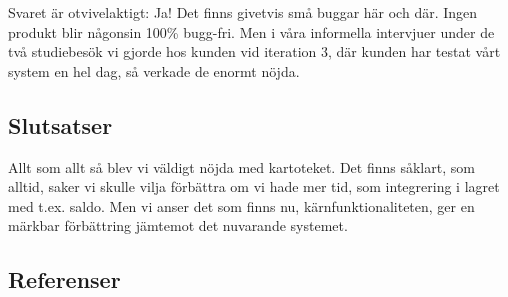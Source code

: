 Svaret är otvivelaktigt: Ja! Det finns
givetvis små buggar här och där. Ingen
produkt blir någonsin 100\% bugg-fri.
Men i våra informella intervjuer under de två studiebesök vi gjorde hos kunden
vid iteration 3, där kunden har testat
vårt system en hel dag, så verkade de enormt nöjda.




\subsection{Slutsatser}
Allt som allt så blev vi väldigt nöjda med kartoteket.
Det finns såklart, som alltid, saker vi skulle vilja förbättra om vi
hade mer tid, som integrering i lagret med t.ex. saldo.
Men vi anser det som finns nu, kärnfunktionaliteten,
ger en märkbar förbättring jämtemot det nuvarande systemet.




\subsection{Referenser}
\vspace{-9mm}
\renewcommand{\refname}{}
\begin{thebibliography}{9}

\end{thebibliography}
